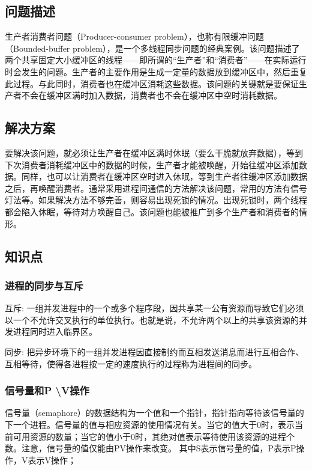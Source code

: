 \documentclass[withoutpreface,bwprint]{cumcmthesis} %
\begin{document}
\subsection{问题描述}

生产者消费者问题（Producer-consumer problem），也称有限缓冲问题（Bounded-buffer problem），是一个多线程同步问题的经典案例。该问题描述了两个共享固定大小缓冲区的线程——即所谓的“生产者”和“消费者”——在实际运行时会发生的问题。生产者的主要作用是生成一定量的数据放到缓冲区中，然后重复此过程。与此同时，消费者也在缓冲区消耗这些数据。该问题的关键就是要保证生产者不会在缓冲区满时加入数据，消费者也不会在缓冲区中空时消耗数据。

\subsection{解决方案}

要解决该问题，就必须让生产者在缓冲区满时休眠（要么干脆就放弃数据），等到下次消费者消耗缓冲区中的数据的时候，生产者才能被唤醒，开始往缓冲区添加数据。同样，也可以让消费者在缓冲区空时进入休眠，等到生产者往缓冲区添加数据之后，再唤醒消费者。通常采用进程间通信的方法解决该问题，常用的方法有信号灯法等。如果解决方法不够完善，则容易出现死锁的情况。出现死锁时，两个线程都会陷入休眠，等待对方唤醒自己。该问题也能被推广到多个生产者和消费者的情形。

\subsection{知识点}

\subsubsection{进程的同步与互斥}
互斥: 一组并发进程中的一个或多个程序段，因共享某一公有资源而导致它们必须以一个不允许交叉执行的单位执行。也就是说，不允许两个以上的共享该资源的并发进程同时进入临界区。

同步: 把异步环境下的一组并发进程因直接制约而互相发送消息而进行互相合作、互相等待，使得各进程按一定的速度执行的过程称为进程间的同步。
\subsubsection{信号量和P \textbackslash V操作}
信号量（semaphore）的数据结构为一个值和一个指针，指针指向等待该信号量的下一个进程。信号量的值与相应资源的使用情况有关。当它的值大于0时，表示当前可用资源的数量；当它的值小于0时，其绝对值表示等待使用该资源的进程个数。注意，信号量的值仅能由PV操作来改变。
其中S表示信号量的值，P表示P操作，V表示V操作；   
\end{document}
